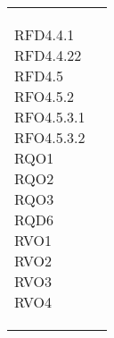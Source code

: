 \begin{longtable}[H]{| >{\centering\bfseries}p{8cm} | >{\centering\arraybackslash}p{8cm} |}
{    RFD4.4.1                                                                                                     \\
    RFD4.4.22                                                                                                    \\
    RFD4.5                                                                                                       \\
    RFO4.5.2                                                                                                     \\
    RFO4.5.3.1                                                                                                   \\
    RFO4.5.3.2                                                                                                   \\
    RQO1                                                                                                         \\
    RQO2                                                                                                         \\
    RQO3                                                                                                         \\
    RQD6                                                                                                         \\
    RVO1                                                                                                         \\
    RVO2                                                                                                         \\
    RVO3                                                                                                         \\
    RVO4                                                                                                         \\
        \rule{0pt}{4ex}
    }                                                                                                            \\


\end{longtable}
